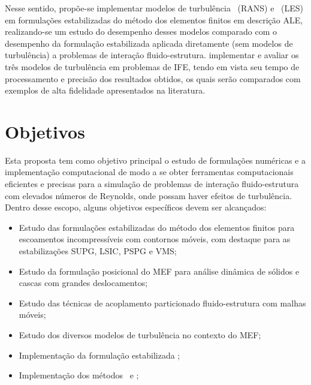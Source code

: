Nesse sentido, propõe-se implementar modelos de turbulência \RANS\ (RANS) e \LES\ (LES) em formulações estabilizadas do método dos elementos finitos em descrição ALE, realizando-se um estudo do desempenho desses modelos comparado com o desempenho da formulação estabilizada aplicada diretamente (sem modelos de turbulência) a problemas de interação fluido-estrutura.  implementar e avaliar os três modelos de turbulência em problemas de IFE, tendo em vista seu tempo de processamento e precisão dos resultados obtidos, os quais serão comparados com exemplos de alta fidelidade apresentados na literatura.


\section{Objetivos}

Esta proposta tem como objetivo principal o estudo de formulações numéricas e a implementação computacional de modo a se obter ferramentas computacionais eficientes e precisas para a simulação de problemas de interação fluido-estrutura com elevados números de Reynolds, onde possam haver efeitos de turbulência. Dentro desse escopo, alguns objetivos específicos devem ser alcançados:

\begin{itemize}
    \item Estudo das formulações estabilizadas do método dos elementos finitos para escoamentos incompressíveis com contornos móveis, com destaque para as estabilizações SUPG, LSIC, PSPG e VMS;

    \item Estudo da formulação posicional do MEF para análise dinâmica de sólidos e cascas com grandes deslocamentos;

    \item Estudo das técnicas de acoplamento particionado fluido-estrutura com malhas móveis;

    \item Estudo dos diversos modelos de turbulência no contexto do MEF;

    \item Implementação da formulação estabilizada \VMS;

    \item Implementação dos métodos \RANS\ e \LES;
\end{itemize}

